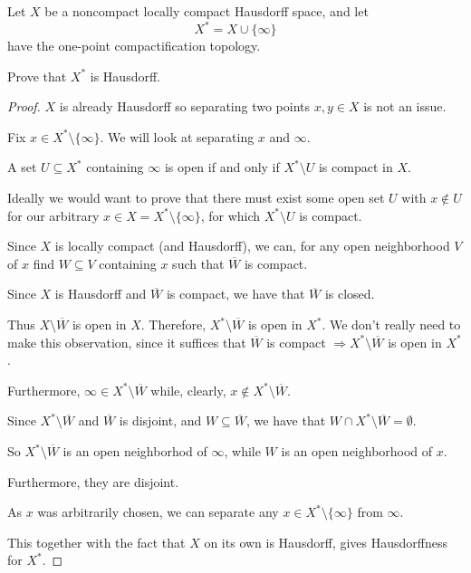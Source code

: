 \documentclass[11pt]{article}
\begin{document}
\begin{prob}
    Let $X$ be a noncompact locally compact Hausdorff 
    space, and let 
    \[
        X^* = X \cup \{\infty\}
    \]
    have the one-point compactification topology. 

    Prove that $X^*$ is Hausdorff. 
\end{prob}
\begin{proof}
    $X$ is already Hausdorff so 
    separating two points $x,y \in X$ is not an issue. 

    Fix $x\in X^* \setminus \{\infty\}$. 
    We will look at separating 
    $x$ and $\infty$. 

    A set $U \subseteq X^*$ containing 
    $\infty$ is open if and only 
    if $X^* \setminus U$ is compact in $X$. 

    Ideally we would want to prove that there 
    must exist some open set 
    $U$ with $x \not\in U$ for our arbitrary $x \in X = 
    X^* \setminus \{\infty\}$, for which 
    $X^* \setminus U$ is compact. 
    
    Since $X$ is locally compact (and Hausdorff), 
    we can, for any 
    open neighborhood $V$ of $x$ find 
    $W \subseteq V$ containing $x$ such that 
    $\overline W$ is compact. 
    
    Since $X$ is Hausdorff and $\overline W$ is compact, 
    we have that $\overline W$ is closed. 

    Thus $X \setminus \overline W$ is open in $X$. 
    Therefore, $X^* \setminus \overline W$ is 
    open in $X^*$.  
    We don't really need to make this observation, since 
    it suffices that $\overline W$ is compact 
    $\Rightarrow X^* \setminus \overline W$ is 
    open in $X^*$. 

    Furthermore, $\infty \in X^* \setminus \overline W$ while, 
    clearly, $x\not\in X^* \setminus \overline W$.
    
    Since $X^* \setminus \overline W$ and $\overline W$ is 
    disjoint, and $W \subseteq \overline W$, we have that 
    $W \cap X^* \setminus \overline W = \emptyset$. 

    So $X^* \setminus \overline W$ is an open 
    neighborhod of $\infty$, while $W$ is an open neighborhood 
    of $x$. 

    Furthermore, they are disjoint. 

    As $x$ was arbitrarily chosen, we can 
    separate any $x \in X^* \setminus \{\infty\}$ from 
    $\infty$. 

    This together with the fact that $X$ on its own is 
    Hausdorff, gives Hausdorffness for $X^*$. 
\end{proof}
\end{document}
